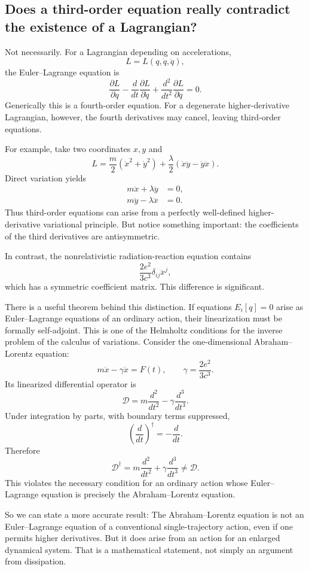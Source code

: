 \subsection{Does a third-order equation really contradict the existence of a
Lagrangian?}
Not necessarily.
For a Lagrangian depending on accelerations,
\[
L=L(q,\dot q,\ddot q),
\]
the Euler–Lagrange equation is
\[
\boxed{
\frac{\partial L}{\partial q}
-\frac{d}{dt}\frac{\partial L}{\partial\dot q}
+\frac{d^2}{dt^2}\frac{\partial L}{\partial\ddot q}
=0.
}
\]
Generically this is a fourth-order equation. For a degenerate higher-derivative
Lagrangian, however, the fourth derivatives may cancel, leaving third-order
equations.

For example, take two coordinates \(x,y\) and
\[
L=\frac{m}{2}(\dot x^2+\dot y^2)
+\frac{\lambda}{2}
(\dot x\ddot y-\dot y\ddot x).
\]
Direct variation yields
\[
\boxed{
\begin{aligned}
m\ddot x+\lambda\dddot y&=0,\\
m\ddot y-\lambda\dddot x&=0.
\end{aligned}
}
\]
Thus third-order equations can arise from a perfectly well-defined
higher-derivative variational principle.
But notice something important: the coefficients of the third derivatives are
antisymmetric.

In contrast, the nonrelativistic radiation-reaction equation contains
\[
\frac{2e^2}{3c^3}\delta_{ij}\dddot x^j,
\]
which has a symmetric coefficient matrix.
This difference is significant.

There is a useful theorem behind this distinction.
If equations \(E_i[q]=0\) arise as Euler–Lagrange equations of an ordinary
action, their linearization must be formally self-adjoint. This is one of the
Helmholtz conditions for the inverse problem of the calculus of variations.
Consider the one-dimensional Abraham–Lorentz equation:
\[
m\ddot x-\gamma\dddot x=F(t),
\qquad
\gamma=\frac{2e^2}{3c^3}.
\]
Its linearized differential operator is
\[
\mathcal D
=
m\frac{d^2}{dt^2}
-\gamma\frac{d^3}{dt^3}.
\]
Under integration by parts, with boundary terms suppressed,
\[
\left(\frac{d}{dt}\right)^\dagger
=-\frac{d}{dt}.
\]
Therefore
\[
\mathcal D^\dagger
=
m\frac{d^2}{dt^2}
+\gamma\frac{d^3}{dt^3}
\ne\mathcal D.
\]
This violates the necessary condition for an ordinary action whose
Euler–Lagrange equation is precisely the Abraham–Lorentz equation.

So we can state a more accurate result:
The Abraham–Lorentz equation is not an Euler–Lagrange equation of a
conventional single-trajectory action, even if one permits higher derivatives.
But it does arise from an action for an enlarged dynamical system.
That is a mathematical statement, not simply an argument from dissipation.

